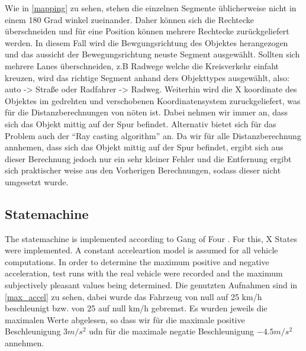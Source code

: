 \documentclass[11pt,oneside,openright]{mpreport}
\begin{document}
Wie in \cref{mapping} zu sehen, stehen die einzelnen Segmente üblicherweise nicht in einem 180 Grad winkel zueinander.
Daher können sich die Rechtecke überschneiden und für eine Position können mehrere Rechtecke zurückgeliefert werden. In diesem Fall wird die Bewgungsrichtung des Objektes herangezogen
und das aussicht der Bewegungsrichtung neuste Segment ausgewählt. Sollten sich mehrere Lanes überschneiden, z.B Radwege welche die Kreisverkehr einfaht kreuzen, wird 
das richtige Segment anhand ders Objekttypes ausgewählt, also: auto -> Straße oder Radfahrer -> Radweg. Weiterhin wird die X koordinate des Objektes im gedrehten und verschobenen Koordinatensystem
zuruckgeliefert, was für die Distanzberechnungen von nöten ist. Dabei nehmen wir immer an, dass sich das Objekt mittig auf der Spur befindet. Alternativ bietet sich für das Problem auch
der ``Ray casting algorithm'' \cite{Galetzka2017} an. Da wir für alle Distanzberechnung annhemen, dass sich das Objekt mittig auf der Spur befindet, ergibt sich aus dieser Berechnung jedoch nur ein sehr kleiner
Fehler und die Entfernung ergibt sich praktischer weise aus den Vorherigen Berechnungen, sodass dieser nicht umgesetzt wurde.

\subsection{Statemachine}

% 
The statemachine is implemented according to Gang of Four \cite{lester2008gang}. For this, X States were implemented. 
A constant acceleartion model is assumed for all vehicle computations. In order to determine the maximum positive and negative acceleration, 
test runs with the real vehicle  were recorded and the maximum subjectively pleasant values being determined. 
Die genutzten Aufnahmen sind in \cref{max_accel} zu sehen, dabei wurde das Fahrzeug von null auf 25 km/h beschleunigt bzw. von 25 auf null km/h gebremst.
Es wurden jeweils die maximalen Werte abgelesen, so dass wir für die maximale positive Beschleunigung $3m/{s^2}$ udn für
die maximale negatie Beschleunigung  $-4.5m/{s^2}$ annehmen.
\end{document}
